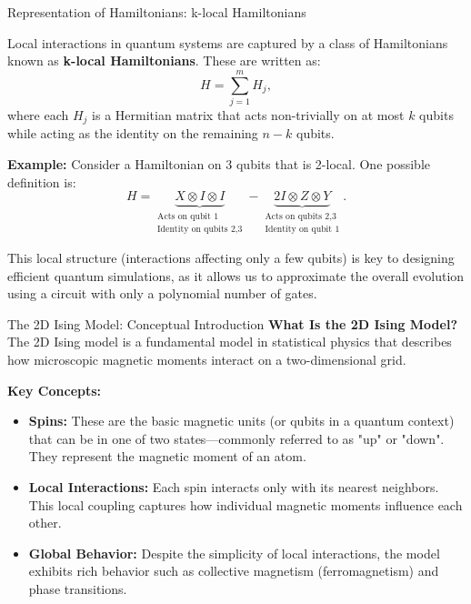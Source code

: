 \documentclass[aspectratio=169,xcolor=dvipsnames]{beamer}
\begin{document}
\begin{frame}{Representation of Hamiltonians: k-local Hamiltonians}

Local interactions in quantum systems are captured by a class of Hamiltonians known as \textbf{k-local Hamiltonians}. These are written as:
\[
H = \sum_{j=1}^{m} H_j,
\]
where each \(H_j\) is a Hermitian matrix that acts non-trivially on at most \(k\) qubits while acting as the identity on the remaining \(n-k\) qubits. 

\medskip

\textbf{Example:} Consider a Hamiltonian on 3 qubits that is 2-local. One possible definition is:
\[
H = \underbrace{X \otimes I \otimes I}_{\substack{\text{Acts on qubit 1} \\ \text{Identity on qubits 2,3}}} 
    - \underbrace{2I \otimes Z \otimes Y}_{\substack{\text{Acts on qubits 2,3} \\ \text{Identity on qubit 1}}}.
\]

\medskip

This local structure (interactions affecting only a few qubits) is key to designing efficient quantum simulations, as it allows us to approximate the overall evolution using a circuit with only a polynomial number of gates.

\end{frame}

\begin{frame}{The 2D Ising Model: Conceptual Introduction}
\textbf{What Is the 2D Ising Model?}\\[0.3cm]
The 2D Ising model is a fundamental model in statistical physics that describes how microscopic magnetic moments interact on a two-dimensional grid.

\vspace{0.3cm}
\textbf{Key Concepts:}
\begin{itemize}
    \item \textbf{Spins:}  
    These are the basic magnetic units (or qubits in a quantum context) that can be in one of two states—commonly referred to as "up" or "down". They represent the magnetic moment of an atom.
    \item \textbf{Local Interactions:}  
    Each spin interacts only with its nearest neighbors. This local coupling captures how individual magnetic moments influence each other.
    \item \textbf{Global Behavior:}  
    Despite the simplicity of local interactions, the model exhibits rich behavior such as collective magnetism (ferromagnetism) and phase transitions.
\end{itemize}

\end{frame}
\end{document}
